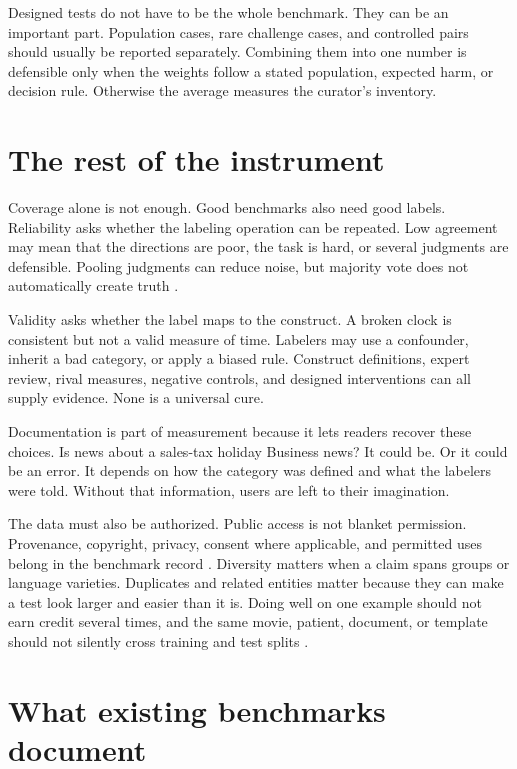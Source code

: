 \documentclass[11pt]{article}
\begin{document}
Designed tests do not have to be the whole benchmark. They can be an important part. Population cases, rare challenge cases, and controlled pairs should usually be reported separately. Combining them into one number is defensible only when the weights follow a stated population, expected harm, or decision rule. Otherwise the average measures the curator's inventory.

\section*{The rest of the instrument}

Coverage alone is not enough. Good benchmarks also need good labels. Reliability asks whether the labeling operation can be repeated. Low agreement may mean that the directions are poor, the task is hard, or several judgments are defensible. Pooling judgments can reduce noise, but majority vote does not automatically create truth \citep{artstein2008agreement}.

Validity asks whether the label maps to the construct. A broken clock is consistent but not a valid measure of time. Labelers may use a confounder, inherit a bad category, or apply a biased rule. Construct definitions, expert review, rival measures, negative controls, and designed interventions can all supply evidence. None is a universal cure.

Documentation is part of measurement because it lets readers recover these choices. Is news about a sales-tax holiday Business news? It could be. Or it could be an error. It depends on how the category was defined and what the labelers were told. Without that information, users are left to their imagination.

The data must also be authorized. Public access is not blanket permission. Provenance, copyright, privacy, consent where applicable, and permitted uses belong in the benchmark record \citep{gebru2021datasheets,longpre2024provenance}. Diversity matters when a claim spans groups or language varieties. Duplicates and related entities matter because they can make a test look larger and easier than it is. Doing well on one example should not earn credit several times, and the same movie, patient, document, or template should not silently cross training and test splits \citep{barz2020duplicates}.

\section*{What existing benchmarks document}
\end{document}
